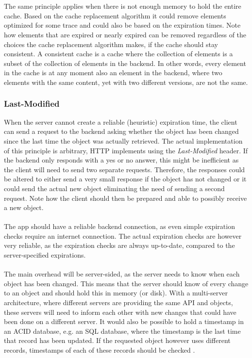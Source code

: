 \documentclass[pdftex,a4paper,12pt,twoside]{report}
\begin{document}
\\\\
The same principle applies when there is not enough memory to hold the entire cache. Based on the cache replacement algorithm it could remove elements optimized for some trace and could also be based on the expiration times. Note how elements that are expired or nearly expired can be removed regardless of the choices the cache replacement algorithm makes, if the cache should stay consistent. A consistent cache is a cache where the collection of elements is a subset of the collection of elements in the backend. In other words, every element in the cache is at any moment also an element in the backend, where two elements with the same content, yet with two different versions, are not the same.
\subsubsection{Last-Modified}
When the server cannot create a reliable (heuristic) expiration time, the client can send a request to the backend asking whether the object has been changed since the last time the object was actually retrieved. The actual implementation of this principle is arbitrary, HTTP implements using the \emph{Last-Modified} header. If the backend only responds with a yes or no answer, this might be inefficient as the client will need to send two separate requests. Therefore, the responses could be altered to either send a very small response if the object has not changed or it could send the actual new object eliminating the need of sending a second request. Note how the client should then be prepared and able to possibly receive a new object.
\\\\
The app should have a reliable backend connection, as even simple expiration checks require an internet connection. The actual expiration checks are however very reliable, as the expiration checks are always up-to-date, compared to the server-specified expirations.
\\\\
The main overhead will be server-sided, as the server needs to know when each object has been changed. This means that the server should  know of every change to an object and should hold this in memory (or disk). With a multi-server architecture, where different servers are providing the same API and objects, these servers will need to inform each other with new changes that could have been done on a different server. It would also be possible to hold a timestamp in an ACID database, e.g. an SQL database, where the timestamp is the last time that record has been updated. If the requested object however uses different records, timestamps of each of these records should be checked \citep{http_caching}.
\end{document}
